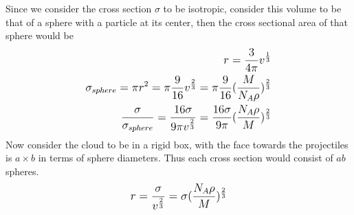 \documentclass[12pt]{article}
\begin{document}
Since we consider the cross section $\sigma$ to be isotropic, consider this volume to be that of a sphere with a particle at its center, then the cross sectional area of that sphere would be 
\begin{equation}
\begin{split}
\mathlarger{
r = \frac{3}{4\pi}v^{\frac{1}{3}}
}\\
\mathlarger{
\sigma_{sphere} = \pi r^2 = \pi\frac{9}{16}v^{\frac{2}{3}} = \pi\frac{9}{16}(\frac{M}{N_A\rho})^{\frac{2}{3}}
}\\
\mathlarger{
\frac{\sigma}{\sigma_{sphere}} = \frac{16\sigma}{9\pi v^{\frac{2}{3}}} = 
\frac{16\sigma}{9\pi}(\frac{N_A\rho}{M})^{\frac{2}{3}}
}\\
\end{split}
\end{equation}
Now consider the cloud to be in a rigid box, with the face towards the projectiles is $a\times b$ in terms of sphere diameters. Thus each cross section would consist of $ab$ spheres. 
\begin{equation}
\begin{split}
\mathlarger{
r = \frac{\sigma}{v^{\frac{2}{3}}} = \sigma(\frac{N_A\rho}{M})^\frac{2}{3} 
}\\
\end{split}
\end{equation}
\end{document}
